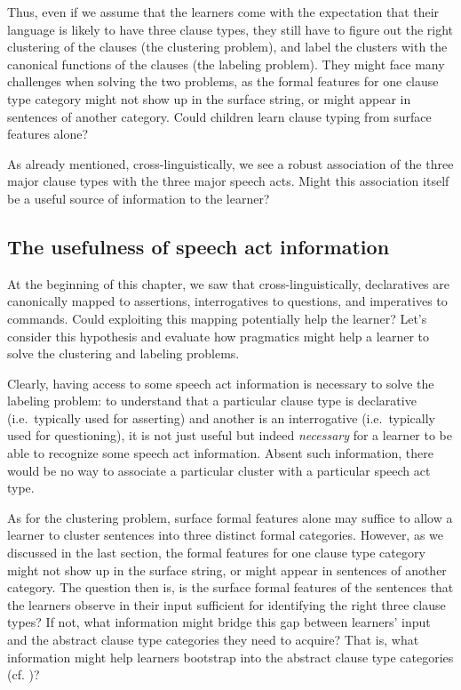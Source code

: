 Thus, even if we assume that the learners come with the expectation that their language is likely to have three clause types, they still have to figure out the right clustering of the clauses (the clustering problem), and label the clusters with the canonical functions of the clauses (the labeling problem). They might face many challenges when solving the two problems, as the formal features for one clause type category might not show up in the surface string, or might appear in sentences of another category. Could children learn clause typing from surface features alone? 

As already mentioned, cross-linguistically, we see a robust association of the three major clause types with the three major speech acts. Might this association itself be a useful source of information to the learner?

\subsection{The usefulness of speech act information}
\label{sec:intro:cl:prag}

At the beginning of this chapter, we saw that cross-linguistically, declaratives are canonically mapped to assertions, interrogatives to questions, and imperatives to commands. Could exploiting this mapping potentially help the learner? Let's consider this hypothesis and evaluate how pragmatics might help a learner to solve the clustering and labeling problems.

Clearly, having access to some speech act information is necessary to solve the labeling problem: to understand that a particular clause type is declarative (i.e.\ typically used for asserting) and another is an interrogative (i.e.\ typically used for questioning), it is not just useful but indeed \emph{necessary} for a learner to be able to recognize some speech act information. Absent such information, there would be no way to associate a particular cluster with a particular speech act type.

As for the clustering problem, surface formal features alone may suffice to allow a learner to cluster sentences into three distinct formal categories. However, as we discussed in the last section, the formal features for one clause type category might not show up in the surface string, or might appear in sentences of another category. The question then is, is the surface formal features of the sentences that the learners observe in their input sufficient for identifying the right three clause types? If not, what information might bridge this gap between learners' input and the abstract clause type categories they need to acquire? That is, what information might help learners bootstrap into the abstract clause type categories (cf. \cite{pinker1984, gleitman1990, hacquardlidz2018})? 


